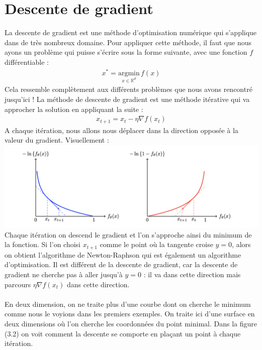     
\newpage






\section{Descente de gradient}
La descente de gradient est une méthode d’optimisation numérique qui s’applique dans de très nombreux domaine. Pour appliquer cette méthode, il faut que nous ayons un problème qui puisse s’écrire sous la forme suivante, avec une fonction $f$ différentiable :
\begin{eqnarray*}
    x^* = \underset{x \in \mathbb{R}^d}{\mathrm{argmin}}\, f(x)
\end{eqnarray*}
Cela ressemble complètement aux différents problèmes que nous avons rencontré jusqu’ici ! La méthode de descente de gradient est une méthode itérative qui va approcher la solution en appliquant la suite :
\begin{eqnarray*}
    x_{t+1} = x_t - \eta \nabla f(x_t)
\end{eqnarray*}
A chaque itération, nous allons nous déplacer dans la direction opposée à la valeur du gradient. Visuellement :
\\
\includegraphics[width=\linewidth]{./img/notions_math/gradiant_descent/courbe_1}
\\
Chaque itération on descend le gradient et l’on s’approche ainsi du minimum de la fonction. Si l’on choisi $x_{t+1}$ comme le point où la tangente croise $y = 0$, alors on obtient l’algorithme de Newton-Raphson qui est également un algorithme d’optimisation. Il est différent de la descente de gradient, car la descente de gradient ne cherche pas à aller jusqu’à $y = 0$ : il va dans cette direction mais parcours $\eta \nabla f(x_t)$ dans cette direction.
\\
\\
En deux dimension, on ne traite plus d’une courbe dont on cherche le minimum comme nous le voyions dans les premiers exemples. On traite ici d’une surface en deux dimensions où l’on cherche les coordonnées du point minimal. Dans la figure (3.2) on voit comment la descente se comporte en plaçant un point à chaque itération.
